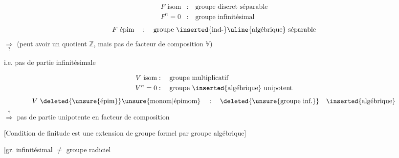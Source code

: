 
\[
\begin{aligned}
F\text{ isom}&:\quad\text{groupe discret séparable}\\
F^n=0&:\quad\text{groupe infinitésimal}
\end{aligned}
\]
\[
F\text{ épim}\quad :\quad \text{groupe \inserted{ind-}\uline{algébrique} séparable}
\]
$\underset{?}{\Longrightarrow}$ (peut avoir un quotient $\mathbb Z$, mais pas de facteur de composition $\mathbb V$)

i.e. pas de partie infinitésimale

\[
\begin{aligned}
V\text{ isom}&:\quad\text{groupe multiplicatif}\\
V^n=0&:\quad\text{groupe \inserted{algébrique} unipotent}
\end{aligned}
\]
\[
V\text{ \deleted{\unsure{épim}}\unsure{monom|épimom}}\quad :\quad\deleted{\text{\unsure{groupe inf.}}}\quad\text{\inserted{algébrique}}
\]
$\overset{?}{\Longrightarrow}$ pas de partie unipotente en facteur de composition

[Condition de finitude est   une extension de groupe formel par groupe algébrique]

[gr. infinitésimal $\ne$ groupe radiciel

